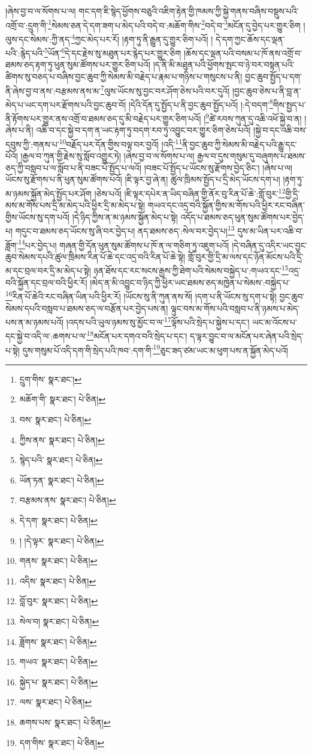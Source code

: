།ཞེས་བྱ་བ་ལ་སོགས་པ་ལ། གང་དག་ཇི་སྙེད་ཕྱོགས་བཅུའི་འཇིག་རྟེན་གྱི་ཁམས་ཀྱི་སྐྱེ་གནས་བཞིས་བསྡུས་པའི་འགྲོ་བ་:དྲུག་གི་\footnote{དྲུག་གིས་  སྣར་ཐང་། }སེམས་ཅན་དེ་དག་ཟག་པ་མེད་པའི་བདེ་བ་:མཆོག་གིས་\footnote{མཆོག་གི་  སྣར་ཐང་།  པེ་ཅིན། }བདེ་བ་\footnote{བས་  སྣར་ཐང་།  པེ་ཅིན། }མངོན་དུ་བྱེད་པར་གྱུར་ཅིག །ལུས་དང་སེམས་:ཀྱི་ནད་\footnote{ཀྱིས་ནས་  སྣར་ཐང་།  པེ་ཅིན། }ཀྱང་མེད་པར་རོ། །རྟག་ཏུ་ནི་རྒྱུན་དུ་གྱུར་ཅིག་པའོ། །
དེ་དག་ཀྱང་ཆོས་དང་ལྡན་པའི་:རྙེད་པའི་\footnote{སྙེད་པའི་  སྣར་ཐང་།  པེ་ཅིན། }ཡོན་\footnote{ཡོན་ཏན་  སྣར་ཐང་།  པེ་ཅིན། }དེ་དང་རྗེས་སུ་མཐུན་པར་རྙེད་པར་གྱུར་ཅིག །ཆོས་དང་ལྡན་པའི་བསམ་པ་ཁོ་ནས་འགྲོ་བ་ཐམས་ཅད་རྟག་ཏུ་ཕུན་སུམ་ཚོགས་པར་གྱུར་ཅིག་པའོ། །ད་ནི་མི་མཐུན་པའི་ཕྱོགས་སྤང་བ་ཉེ་བར་བསྟན་པའི་ཚིགས་སུ་བཅད་པ་བཞིས་བྱང་ཆུབ་ཀྱི་སེམས་མི་བརྗེད་པ་རྣམ་པ་གཉིས་པ་གསུངས་པ་ནི། བྱང་ཆུབ་སྤྱོད་པ་དག་ནི་ཞེས་བྱ་བ་ནས་:བརྩམས་ནས་མ་\footnote{བརྩམས་ནས་  སྣར་ཐང་།  པེ་ཅིན། }ལུས་ཡོངས་སུ་བྱང་བར་ཤོག་ཅེས་པའི་བར་དུའོ། །བྱང་ཆུབ་ཅེས་པ་ནི་བླ་ན་མེད་པ་ཡང་དག་པར་རྫོགས་པའི་བྱང་ཆུབ་བོ། །དེའི་དོན་དུ་སྤྱོད་པ་ནི་བྱང་ཆུབ་སྤྱོད་པའོ། །:དེ་བདག་\footnote{དེ་དག་  སྣར་ཐང་།  པེ་ཅིན། }གིས་སྤྱད་པ་ནི་རྟོགས་པར་གྱུར་ནས་འགྲོ་བ་ཐམས་ཅད་དུ་མི་བརྗེད་པར་གྱུར་ཅིག་པའོ། །\footnote{། །དེ་ལྟར་  སྣར་ཐང་།  པེ་ཅིན། }ཚེ་རབས་ཀུན་དུ་འཆི་འཕོ་སྐྱེ་བ་ན། །ཞེས་པ་ནི། འཆི་བ་དང་སྐྱེ་བ་དག་ན་ཡང་རྟག་ཏུ་བདག་རབ་ཏུ་འབྱུང་བར་གྱུར་ཅིག་ཅེས་པའོ། །སྐྱེ་བ་དང་འཆི་བས་དབུས་ཀྱི་:གནས་པ་\footnote{གནས་  སྣར་ཐང་།  པེ་ཅིན། }བརྗོད་པར་དོན་གྱིས་བལྟ་བར་བྱའོ། །འདི་\footnote{འདིས་  སྣར་ཐང་།  པེ་ཅིན། }ནི་བྱང་ཆུབ་ཀྱི་སེམས་མི་བརྗེད་པའི་རྒྱུ་དང་པོའོ། །རྒྱལ་བ་ཀུན་གྱི་རྗེས་སུ་སློབ་འགྱུར་ཏེ། །ཞེས་བྱ་བ་ལ་སོགས་པ་ལ། རྒྱལ་བ་དུས་གསུམ་དུ་བཞུགས་པ་ཐམས་ཅད་ཀྱི་བསླབ་པ་ལ་སློབ་པ་ནི་བཟང་པོ་སྤྱོད་པ་ལའོ། །བཟང་པོ་སྤྱོད་པ་ཡོངས་སུ་རྫོགས་བྱེད་ཅིང་། །ཞེས་པ་ལ། ཡོངས་སུ་རྫོགས་པ་ནི་ཕུན་སུམ་ཚོགས་པའོ། །ཇི་ལྟར་བྱ་ཞེ་ན། ཚུལ་ཁྲིམས་སྤྱོད་པ་དྲི་མེད་ཡོངས་དག་པ། །རྟག་ཏུ་མ་ཉམས་སྐྱོན་མེད་སྤྱོད་པར་ཤོག །ཅེས་པའོ། །ཇི་ལྟར་དཔེར་ན་ཡིད་བཞིན་གྱི་ནོར་བུ་རིན་པོ་ཆེ་:གློ་བུར་\footnote{བློ་བུར་  སྣར་ཐང་།  པེ་ཅིན། }གྱི་དྲི་མས་མ་གོས་པས་དྲི་མ་མེད་པའི་ཕྱིར་དྲི་མ་མེད་པ་སྟེ། གཡའ་དང་འདྲ་བའི་སྐྱོན་གྱིས་མ་གོས་པའི་ཕྱིར་རང་བཞིན་གྱིས་ཡོངས་སུ་དག་པའོ། །དེ་ཉིད་ཀྱིས་ན་མ་ཉམས་སྐྱོན་མེད་པ་སྟེ། འདོད་པ་ཐམས་ཅད་ཕུན་སུམ་ཚོགས་པར་བྱེད་པ། གདུང་བ་ཐམས་ཅད་ཡོངས་སུ་ཞི་བར་བྱེད་པ། ནད་ཐམས་ཅད་:སེལ་བར་བྱེད་པ།\footnote{སེལ་བ།  སྣར་ཐང་།  པེ་ཅིན། } དུས་མ་ཡིན་པར་འཆི་བ་ཟློག་\footnote{ཟློགས་  སྣར་ཐང་།  པེ་ཅིན། }པར་བྱེད་པ། གཞན་གྱི་དོན་ཕུན་སུམ་ཚོགས་པ་ཁོ་ན་ལ་གཅིག་ཏུ་འཇུག་པའོ། །དེ་བཞིན་དུ་འདིར་ཡང་བྱང་ཆུབ་སེམས་དཔའི་ཚུལ་ཁྲིམས་རིན་པོ་ཆེ་དང་འདྲ་བའི་རིན་པོ་ཆེ་སྟེ། གློ་བུར་གྱི་དྲི་མ་ལས་དང་ཉོན་མོངས་པའི་དྲི་མ་དང་བྲལ་བར་དྲི་མ་མེད་པ་སྟེ། ཉན་ཐོས་དང་རང་སངས་རྒྱས་ཀྱི་ཐེག་པའི་སེམས་བསྐྱེད་པ་:གཡའ་དང་\footnote{གཡའ་  སྣར་ཐང་།  པེ་ཅིན། }འདྲ་བའི་སྐྱོན་དང་བྲལ་བའི་ཕྱིར་རོ། །མེད་ན་མི་འབྱུང་བ་ཉིད་ཀྱི་ཕྱིར་ཡང་ཐམས་ཅད་མཁྱེན་པ་སེམས་:བསྐྱེད་པ་\footnote{སྐྱེད་པ་  སྣར་ཐང་།  པེ་ཅིན། }རིན་པོ་ཆེའི་རང་བཞིན་ཡིན་པའི་ཕྱིར་རོ། །ཡོངས་སུ་ནི་ཀུན་ནས་སོ། །དག་པ་ནི་ཡོངས་སུ་དག་པ་སྟེ། བྱང་ཆུབ་སེམས་དཔའི་བསླབ་པ་ཐམས་ཅད་ལ་བརྩོན་པར་བྱེད་པས་ན། ལྟུང་བས་མ་གོས་པའི་བསླབ་པ་ནི་ཉམས་པ་མེད་པས་ན་མ་ཉམས་པའོ། །འདས་པའི་ཡུལ་ཉམས་སུ་མྱོང་བ་ལ་\footnote{ལས་  སྣར་ཐང་།  པེ་ཅིན། }ལྟོས་པའི་སྲེད་པ་སྐྱེས་པ་དང་། ཡང་མ་འོངས་པ་དང་སྐྱེ་བ་འདི་ལ་:ཆགས་པ་ལ་\footnote{ཆགས་པས་  སྣར་ཐང་།  པེ་ཅིན། }མངོན་པར་དགའ་བའི་སྲེད་པ་དང་། ད་ལྟར་བྱུང་བ་ལ་མངོན་པར་ཞེན་པའི་སྲེད་པ་སྟེ། དུས་གསུམ་པོ་འདི་དག་གི་སྲེད་པའི་ཁབ་:དག་གི་\footnote{དག་གིས་  སྣར་ཐང་།  པེ་ཅིན། }ཅུང་ཟད་ཙམ་ཡང་མ་ཕུག་པས་ན་སྐྱོན་མེད་པའོ། 